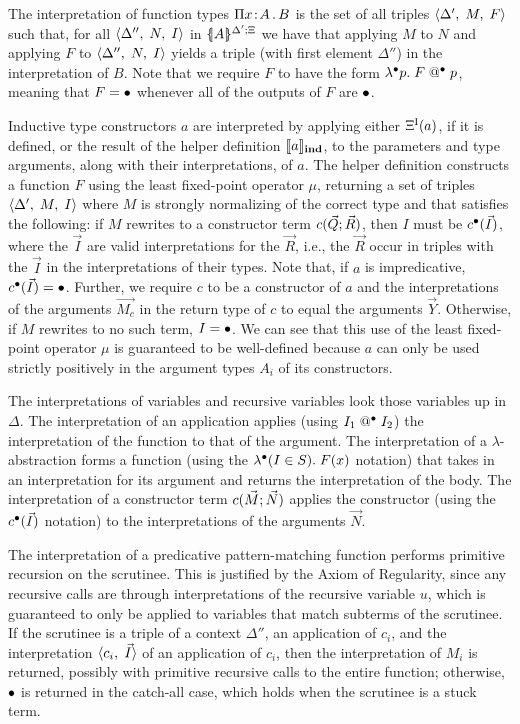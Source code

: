 \documentclass{article}
\begin{document}
The interpretation of function types $\pitype{x}{A}{B}$ is the set of
all triples $\triple{\Delta'}{M}{F}$ such that, for all
$\triple{\Delta''}{N}{I}$ in $\interpd[\iargs{\Delta'}{\Xi}]{A}$ we
have that applying $M$ to $N$ and applying $F$ to
$\triple{\Delta''}{N}{I}$ yields a triple (with first element
$\Delta''$) in the interpretation of $B$.  Note that we require $F$ to
have the form $\lamstarnot{p}{\appstar{F}{p}}$, meaning that
$F=\dummy$ whenever all of the outputs of $F$ are $\dummy$.

Inductive type constructors $a$ are interpreted by applying either
$\Dlookup{a}$, if it is defined, or the result of the helper
definition $\interpind{a}$, to the parameters and type
arguments, along with their interpretations, of $a$.
The helper definition constructs a function $F$
using the least fixed-point operator $\mu$, returning a set
of triples $\triple{\Delta'}{M}{I}$ where $M$ is strongly normalizing
of the correct type and that satisfies the following: if $M$ rewrites
to a constructor term $\ctorapp{c}{\vec{Q}}{\vec{R}}$, then $I$ must
be $\ctorstar{c}{\vec{I}}$, where the $\vec{I}$ are valid
interpretations for the $\vec{R}$, i.e., the $\vec{R}$ occur in
triples with the $\vec{I}$ in the interpretations of their types. Note
that, if $a$ is impredicative, $\ctorstar{c}{\vec{I}}=\dummy$.
Further, we require $c$ to be a constructor of $a$ and the
interpretations of the arguments $\vec{M_c}$ in the return type of $c$
to equal the arguments $\vec{Y}$. Otherwise, if $M$ rewrites to no
such term, $I=\dummy$. We can see that this use of the least
fixed-point operator $\mu$ is guaranteed to be well-defined because
$a$ can only be used strictly positively in the argument types $A_i$
of its constructors.


The interpretations of variables and recursive variables look those
variables up in $\Delta$. The interpretation of an application applies
(using $\appstar{I_1}{I_2}$) the interpretation of the function to
that of the argument. The interpretation of a $\lambda$-abstraction
forms a function (using the $\lamstar{I}{S}{F(x)}$ notation) that
takes in an interpretation for its argument and returns the
interpretation of the body. The interpretation of a constructor term
$\ctorapp{c}{\vec{M}}{\vec{N}}$ applies the constructor (using the
$\ctorstar{c}{\vec{I}}$ notation) to the interpretations of the
arguments $\vec{N}$.

The interpretation of a predicative pattern-matching function performs
primitive recursion on the scrutinee. This is
justified by the Axiom of Regularity, since any recursive calls are
through interpretations of the recursive variable $u$, which is
guaranteed to only be applied to variables that match subterms of the
scrutinee. If the scrutinee is a triple of a context $\Delta''$, an
application of $c_i$, and the interpretation $\pair{c_i}{\vec{I}}$ of
an application of $c_i$, then the interpretation of $M_i$ is returned,
possibly with primitive recursive calls to the entire function;
otherwise, $\dummy$ is returned in the catch-all case, which holds when
the scrutinee is a stuck term.
\end{document}
